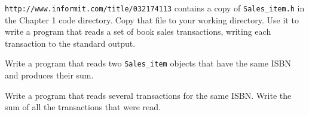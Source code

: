 %
%
\begin{question}
\verb|http://www.informit.com/title/032174113| contains a copy of
\verb|Sales_item.h| in the Chapter 1 code directory. Copy that file to your
working directory. Use it to write a program that reads a set of book sales
transactions, writing each transaction to the standard output.
\end{question}

\begin{question}
Write a program that reads two \verb|Sales_item| objects that
have the same ISBN and produces their sum.
\end{question}

\begin{question}
Write a program that reads several transactions for the same
ISBN. Write the sum of all the transactions that were read.
\end{question}
